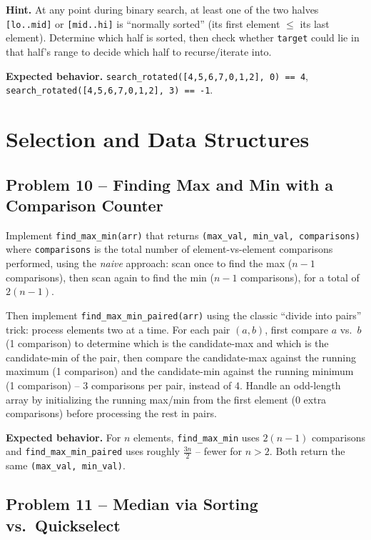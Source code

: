 \documentclass[11pt]{article}
\begin{document}
\textbf{Hint.} At any point during binary search, at least one of the two halves
\texttt{[lo..mid]} or \texttt{[mid..hi]} is ``normally sorted'' (its first element $\le$
its last element). Determine which half is sorted, then check whether \texttt{target}
could lie in that half's range to decide which half to recurse/iterate into.

\textbf{Expected behavior.} \texttt{search\_rotated([4,5,6,7,0,1,2], 0) == 4},
\texttt{search\_rotated([4,5,6,7,0,1,2], 3) == -1}.

\newpage
\section{Selection and Data Structures}

\subsection*{Problem 10 -- Finding Max and Min with a Comparison Counter}

Implement \texttt{find\_max\_min(arr)} that returns \texttt{(max\_val, min\_val,
comparisons)} where \texttt{comparisons} is the total number of element-vs-element
comparisons performed, using the \emph{naive} approach: scan once to find the max
($n-1$ comparisons), then scan again to find the min ($n-1$ comparisons), for a total of
$2(n-1)$.

Then implement \texttt{find\_max\_min\_paired(arr)} using the classic ``divide into
pairs'' trick: process elements two at a time. For each pair $(a,b)$, first compare $a$
vs.\ $b$ (1 comparison) to determine which is the candidate-max and which is the
candidate-min of the pair, then compare the candidate-max against the running maximum (1
comparison) and the candidate-min against the running minimum (1 comparison) -- 3
comparisons per pair, instead of 4. Handle an odd-length array by initializing the running
max/min from the first element (0 extra comparisons) before processing the rest in pairs.

\textbf{Expected behavior.} For $n$ elements, \texttt{find\_max\_min} uses $2(n-1)$
comparisons and \texttt{find\_max\_min\_paired} uses roughly $\frac{3n}{2}$ -- fewer for
$n>2$. Both return the same \texttt{(max\_val, min\_val)}.

\subsection*{Problem 11 -- Median via Sorting vs.\ Quickselect}
\end{document}
